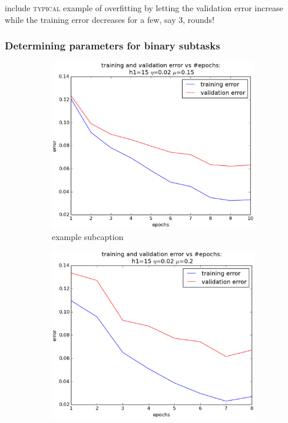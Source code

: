 include \textsc{typical} example of overfitting by letting the validation error increase while the training error decreases for a few, say 3, rounds!

\subsubsection{Determining parameters for binary subtasks}

\begin{figure}[!ht]
	\centering
	\begin{subfigure}[b]{.45\textwidth}
	\centering
	\includegraphics[width=\textwidth]{mlp/plots/4-9_tuned_97_75.eps}
	\caption{example subcaption}
	\label{fig:4_9_tuned}
	\end{subfigure}
	\quad
	\begin{subfigure}[b]{.45\textwidth}
	\centering
	\includegraphics[width=\textwidth]{mlp/plots/3-5_tuned_97_75.eps}

\end{subfigure}
\end{figure}
